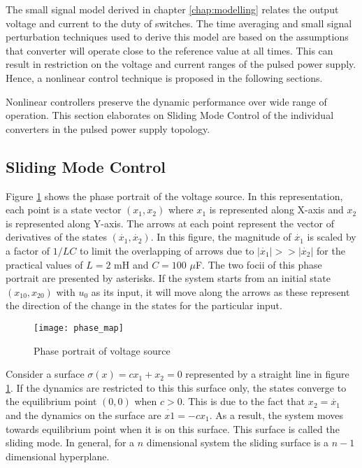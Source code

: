     The small signal model derived in chapter \ref{chap:modelling} relates the output voltage and current to the duty of switches. The time averaging and small signal perturbation techniques used to derive this model are based on the assumptions that converter will operate close to the reference value at all times. This can result in restriction on the voltage and current ranges of the pulsed power supply. Hence, a nonlinear control technique is proposed in the following sections.
    
    Nonlinear controllers preserve the dynamic performance over wide range of operation. This section elaborates on Sliding Mode Control of the individual converters in the pulsed power supply topology.

\subsection{Sliding Mode Control}
    Figure \ref{fig:nl-3} shows the phase portrait of the voltage source. In this representation, each point is a state vector $(x_1,x_2)$ where $x_1$ is represented along X-axis and $x_2$ is represented along Y-axis. The arrows at each point represent the vector of derivatives of the states $(\dot{x_1},\dot{x_2})$. In this figure, the magnitude of $\dot{x_1}$ is scaled by a factor of $1/LC$ to limit the overlapping of arrows due to $|\dot{x_1}| >> |\dot{x_2}|$ for the practical values of $L = 2$ mH and $C = 100$ $\mu$F. The two focii of this phase portrait are presented by asterisks. If the system starts from an initial state $(x_{10},x_{20})$ with $u_0$ as its input, it will move along the arrows as these represent the direction of the change in the states for the particular input.
    \begin{figure}[h]
      \centering
      \texttt{[image: phase\_map]}
      \vspace{-0.5cm}
      \caption{Phase portrait of voltage source}
      \label{fig:nl-3}
	\end{figure}
	Consider a surface $\sigma (x) = c x_1 + x_2 = 0$ represented by a straight line in figure \ref{fig:nl-3}. If the dynamics are restricted to this this surface only, the states converge to the equilibrium point $(0,0)$ when $c > 0$. This is due to the fact that $x_2 = \dot{x_1}$ and the dynamics on the surface are $\dot{x1} = -c x_1$. As a result, the system moves towards equilibrium point when it is on this surface. This surface is called the sliding mode. In general, for a $n$ dimensional system the sliding surface is a $n-1$ dimensional hyperplane.
	
